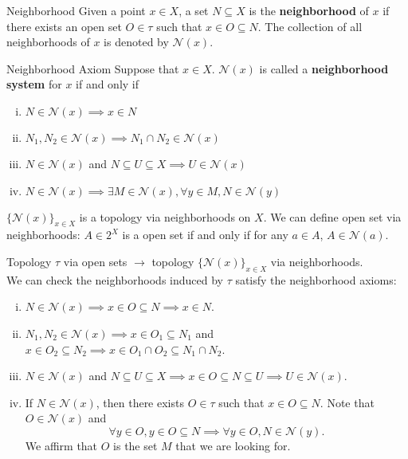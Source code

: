 \documentclass{report}
\begin{document}
\begin{definition}{Neighborhood}{}
	Given a point $x\in X$, a set $N\subseteq X$ is the \textbf{neighborhood} of $x$ if there exists an open set $O\in\tau$ such that $x\in O\subseteq N$. The collection of all neighborhoods of $x$ is denoted by $\mathcal{N}(x)$.
\end{definition}


\begin{definition}{Neighborhood Axiom}{}
	Suppose that $x\in X$. $\mathcal{N}(x)$ is called a \textbf{neighborhood system} for $x$ if and only if
	\begin{enumerate}[(i)] 
		\item $N\in\mathcal{N}(x)\implies x\in N$
		\item $N_1,N_2\in\mathcal{N}(x)\implies N_1\cap N_2\in\mathcal{N}(x)$
		\item $N\in\mathcal{N}(x)$ and $N\subseteq U\subseteq X\implies U\in\mathcal{N}(x)$
		\item $N\in\mathcal{N}(x)\implies \exists M\in\mathcal{N}(x),\forall y\in M,N\in\mathcal{N}(y)\hspace{1pt}$
	\end{enumerate}
	$\{\mathcal{N}(x)\}_{x\in X}$ is a topology via neighborhoods on $X$. We can define open set via neighborhoods: $A\in 2^X$ is a open set if and only if for any $a\in A$, $A\in\mathcal{N}(a)$.
\end{definition}

\begin{prf}
	Topology $\tau$ via open sets $\rightarrow$ topology $\{\mathcal{N}(x)\}_{x\in X}$ via neighborhoods.\\
	We can check the neighborhoods induced by $\tau$ satisfy the neighborhood axioms:
	\begin{enumerate}[(i)]
		\item $N\in\mathcal{N}(x)\implies x\in O\subseteq N \implies x\in N$.
		\item $N_1,N_2\in\mathcal{N}(x)\implies x\in O_1\subseteq N_1 $ and $ x\in O_2\subseteq N_2\implies x\in O_1\cap O_2\subseteq N_1\cap N_2$.
		\item $N\in\mathcal{N}(x)$ and $ N\subseteq U\subseteq X\implies x\in O\subseteq N\subseteq U\implies U\in\mathcal{N}(x)$.
		\item If $N\in\mathcal{N}(x)$, then there exists $O\in\tau$ such that $x\in O\subseteq N$. Note that $O\in \mathcal{N}(x)$ and
		      \[
			      \forall y\in O,y\in O\subseteq N\implies\forall y\in O,N\in\mathcal{N}(y).
		      \]
		      We affirm that $O$ is the set $M$ that we are looking for.
	\end{enumerate}
\end{prf}
\end{document}
